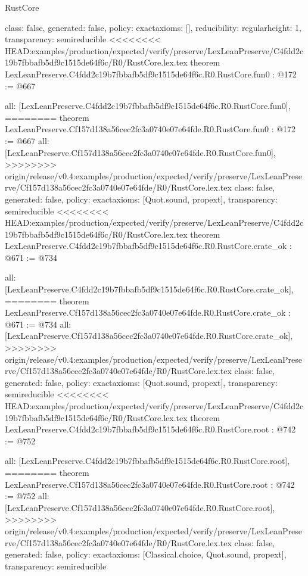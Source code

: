 \begin{lexlean}{RustCore}
\begin{coremodule}
{\begin{coremodule}
{{{  class: false,
  generated: false,
  policy: exact{axioms: []},
  reducibility: regular{height: 1},
  transparency: semireducible
}
<<<<<<<< HEAD:examples/production/expected/verify/preserve/LexLeanPreserve/C4fdd2c19b7fbbafb5df9c1515de64f6c/R0/RustCore.lex.tex
theorem LexLeanPreserve.C4fdd2c19b7fbbafb5df9c1515de64f6c.R0.RustCore.fun0 : @172 := @667 {
  all: [LexLeanPreserve.C4fdd2c19b7fbbafb5df9c1515de64f6c.R0.RustCore.fun0],
========
theorem LexLeanPreserve.Cf157d138a56cec2fc3a0740e07e64fde.R0.RustCore.fun0 : @172 := @667 {
  all: [LexLeanPreserve.Cf157d138a56cec2fc3a0740e07e64fde.R0.RustCore.fun0],
>>>>>>>> origin/release/v0.4:examples/production/expected/verify/preserve/LexLeanPreserve/Cf157d138a56cec2fc3a0740e07e64fde/R0/RustCore.lex.tex
  class: false,
  generated: false,
  policy: exact{axioms: [Quot.sound, propext]},
  transparency: semireducible
}
<<<<<<<< HEAD:examples/production/expected/verify/preserve/LexLeanPreserve/C4fdd2c19b7fbbafb5df9c1515de64f6c/R0/RustCore.lex.tex
theorem LexLeanPreserve.C4fdd2c19b7fbbafb5df9c1515de64f6c.R0.RustCore.crate_ok : @671 := @734 {
  all: [LexLeanPreserve.C4fdd2c19b7fbbafb5df9c1515de64f6c.R0.RustCore.crate_ok],
========
theorem LexLeanPreserve.Cf157d138a56cec2fc3a0740e07e64fde.R0.RustCore.crate_ok : @671 := @734 {
  all: [LexLeanPreserve.Cf157d138a56cec2fc3a0740e07e64fde.R0.RustCore.crate_ok],
>>>>>>>> origin/release/v0.4:examples/production/expected/verify/preserve/LexLeanPreserve/Cf157d138a56cec2fc3a0740e07e64fde/R0/RustCore.lex.tex
  class: false,
  generated: false,
  policy: exact{axioms: [Quot.sound, propext]},
  transparency: semireducible
}
<<<<<<<< HEAD:examples/production/expected/verify/preserve/LexLeanPreserve/C4fdd2c19b7fbbafb5df9c1515de64f6c/R0/RustCore.lex.tex
theorem LexLeanPreserve.C4fdd2c19b7fbbafb5df9c1515de64f6c.R0.RustCore.root : @742 := @752 {
  all: [LexLeanPreserve.C4fdd2c19b7fbbafb5df9c1515de64f6c.R0.RustCore.root],
========
theorem LexLeanPreserve.Cf157d138a56cec2fc3a0740e07e64fde.R0.RustCore.root : @742 := @752 {
  all: [LexLeanPreserve.Cf157d138a56cec2fc3a0740e07e64fde.R0.RustCore.root],
>>>>>>>> origin/release/v0.4:examples/production/expected/verify/preserve/LexLeanPreserve/Cf157d138a56cec2fc3a0740e07e64fde/R0/RustCore.lex.tex
  class: false,
  generated: false,
  policy: exact{axioms: [Classical.choice, Quot.sound, propext]},
  transparency: semireducible
}

}}}}}
\end{coremodule}}
\end{coremodule}
\end{lexlean}
